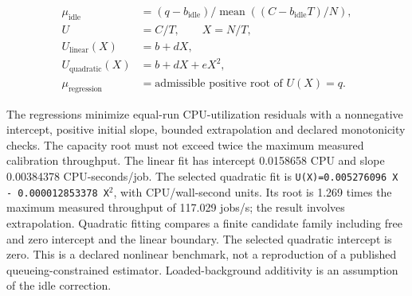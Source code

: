 \documentclass[11pt,a4paper]{article}
\begin{document}
\begin{align*}\mu_{\mathrm{idle}}&=(q-b_{\mathrm{idle}})/\operatorname{mean}((C-b_{\mathrm{idle}}T)/N),\\ U&=C/T,\qquad X=N/T,\\ U_{\mathrm{linear}}(X)&=b+dX,\\U_{\mathrm{quadratic}}(X)&=b+dX+eX^2,\\ \mu_{\mathrm{regression}}&=\text{admissible positive root of }U(X)=q.\end{align*}

The regressions minimize equal-run CPU-utilization residuals with a
nonnegative intercept, positive initial slope, bounded extrapolation and
declared monotonicity checks. The capacity root must not exceed twice the
maximum measured calibration throughput. The linear fit has intercept
0.0158658 CPU and slope 0.00384378 CPU-seconds/job. The selected quadratic
fit is \texttt{U(X)=0.005276096 X - 0.000012853378 X$^2$}, with CPU/wall-second units.
Its root is 1.269 times the maximum measured throughput of 117.029 jobs/s;
the result involves extrapolation. Quadratic fitting compares a finite candidate
family including free and zero intercept and the linear boundary. The selected
quadratic intercept is zero. This is a declared nonlinear benchmark, not a
reproduction of a published queueing-constrained estimator. Loaded-background
additivity is an assumption of the idle correction.
\end{document}
